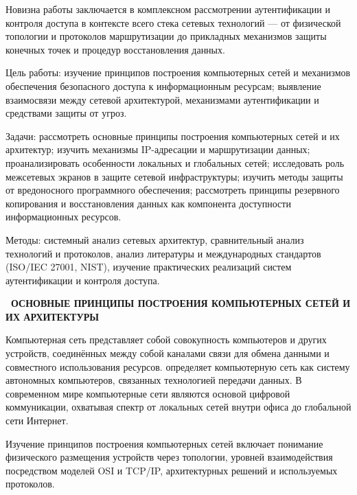 \documentclass{SibFU-docs}
\begin{document}
Новизна работы заключается в комплексном рассмотрении аутентификации и контроля доступа в контексте всего стека сетевых технологий --- от физической топологии и протоколов маршрутизации до прикладных механизмов защиты конечных точек и процедур восстановления данных.

Цель работы: изучение принципов построения компьютерных сетей и механизмов обеспечения безопасного доступа к информационным ресурсам; выявление взаимосвязи между сетевой архитектурой, механизмами аутентификации и средствами защиты от угроз.

Задачи: рассмотреть основные принципы построения компьютерных сетей и их архитектур; изучить механизмы IP-адресации и маршрутизации данных; проанализировать особенности локальных и глобальных сетей; исследовать роль межсетевых экранов в защите сетевой инфраструктуры; изучить методы защиты от вредоносного программного обеспечения; рассмотреть принципы резервного копирования и восстановления данных как компонента доступности информационных ресурсов.

Методы: системный анализ сетевых архитектур, сравнительный анализ технологий и протоколов, анализ литературы и международных стандартов (ISO/IEC 27001, NIST), изучение практических реализаций систем аутентификации и контроля доступа.

\newpage
\vspace*{-2.5em}
\begin{center}\textbf{\thesection\ ОСНОВНЫЕ ПРИНЦИПЫ ПОСТРОЕНИЯ КОМПЬЮТЕРНЫХ СЕТЕЙ И ИХ АРХИТЕКТУРЫ}\end{center}
\vspace*{-1.5em}

Компьютерная сеть представляет собой совокупность компьютеров и других устройств, соединённых между собой каналами связи для обмена данными и совместного использования ресурсов. \cite{tanenbaum2011computer} определяет компьютерную сеть как систему автономных компьютеров, связанных технологией передачи данных. В современном мире компьютерные сети являются основой цифровой коммуникации, охватывая спектр от локальных сетей внутри офиса до глобальной сети Интернет.

Изучение принципов построения компьютерных сетей включает понимание физического размещения устройств через топологии, уровней взаимодействия посредством моделей OSI и TCP/IP, архитектурных решений и используемых протоколов.
\end{document}
